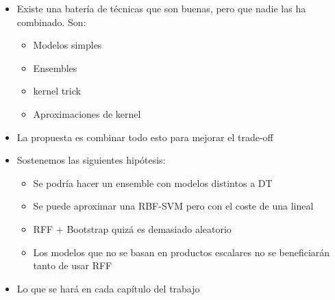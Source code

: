 \begin{note}
  \begin{itemize}
    \item Existe una batería de técnicas que son buenas, pero que nadie las
    ha combinado. Son:
    \begin{itemize}
      \item Modelos simples
      \item Ensembles
      \item kernel trick
      \item Aproximaciones de kernel
    \end{itemize}
    \item La propuesta es combinar todo esto para mejorar el trade-off
    \item Sostenemos las siguientes hipótesis:
    \begin{itemize}
      \item Se podría hacer un ensemble con modelos distintos a DT
      \item Se puede aproximar una RBF-SVM pero con el coste de una lineal
      \item RFF + Bootstrap quizá es demasiado aleatorio
      \item Los modelos que no se basan en productos escalares no se
      beneficiarán tanto de usar RFF
    \end{itemize}
    \item Lo que se hará en cada capítulo del trabajo
  \end{itemize}
\end{note}

